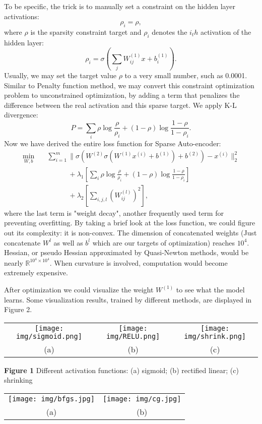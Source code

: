 \documentclass{article} %
\begin{document}
To be specific, the trick is to manually set a constraint on the hidden layer activations:
$$
\rho_i = \rho,
$$
where $\rho$ is the sparsity constraint target and $\rho_i$ denotes the $i_th$ activation of the hidden layer:
$$
\rho_i = \sigma(\sum_j W_{ij}^{(1)} x + b_i^{(1)} ).
$$
Usually, we may set the target value $\rho$ to a very small number, such as 0.0001. Similar to Penalty function method, we may convert this constraint optimization problem to unconstrained optimization, by adding a term that penalizes the difference between the real activation and this sparse target. We apply K-L divergence:
$$
P = \sum_i{\rho \log \frac{\rho}{\rho_i} + (1-\rho) \log \frac{1-\rho}{1-\rho_i} }.
$$
Now we have derived the entire loss function for Sparse Auto-encoder: 
\begin{align*}
\min_{W, b} \quad & \sum_{i=1}^m \|	 \sigma( W^{(2)} \sigma( W^{(1)} x^{(i)}+b^{(1)} )+b^{(2)} )-x^{(i)} \|_2^2 \\
&\quad \quad \quad  + \lambda_1 [\sum_i{\rho \log \frac{\rho}{\rho_i} + (1-\rho) \log \frac{1-\rho}{1-\rho_i} }] \\
& \quad \quad \quad + \lambda_2 [\sum_{i,j,l} (W_{ij}^{(l)})^2],
\end{align*}
where the last term is "weight decay", another frequently used term for preventing overfitting. By taking a brief look at the loss function, we could figure out its complexity: it is non-convex. The dimension of concatenated weights (Just concatenate $W^l$ as well as $b^l$ which are our targets of optimization) reaches $10^4$. Hessian, or pseudo Hessian approximated by Quasi-Newton methods, would be nearly $\mathbb{R}^{10^4 \times 10^4}$. When curvature is involved, computation would become extremely expensive.

After optimization we could visualize the weight $W^{(1)}$ to see what the model learns. Some visualization results, trained by different methods, are displayed in Figure 2.
\begin{tabular}{ccc}
    \texttt{[image: img/sigmoid.png]}  &
    \texttt{[image: img/RELU.png]} &
    \texttt{[image: img/shrink.png]} \\
    (a) & (b) & (c)
\end{tabular}
{\bf Figure 1} Different activation functions: (a) sigmoid; (b) rectified linear; (c) shrinking

\begin{tabular}{cc}
    \texttt{[image: img/bfgs.jpg]}  &
    \texttt{[image: img/cg.jpg]} \\
    (a) & (b)
\end{tabular}
\end{document}
